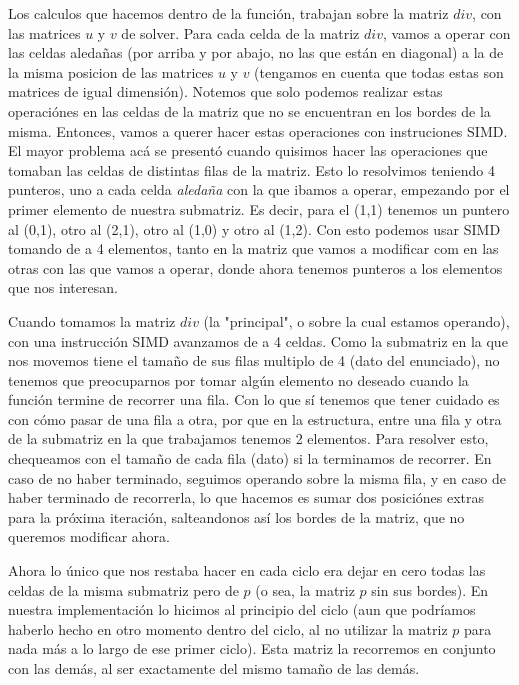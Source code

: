 \par Los calculos que hacemos dentro de la función, trabajan sobre la matriz $div$, con las matrices $u$ y $v$ de solver. Para cada celda de la matriz $div$, vamos a operar con las celdas aledañas (por arriba y por abajo, no las que están en diagonal) a la de la misma posicion de las matrices $u$ y $v$ (tengamos en cuenta que todas estas son matrices de igual dimensión). Notemos que solo podemos realizar estas operaciónes en las celdas de la matriz que no se encuentran en los bordes de la misma. Entonces, vamos a querer hacer estas operaciones con instruciones SIMD. El mayor problema acá se presentó cuando quisimos hacer las operaciones que tomaban las celdas de distintas filas de la matriz. Esto lo resolvimos teniendo 4 punteros, uno a cada celda \textit{aledaña} con la que ibamos a operar, empezando por el primer elemento de nuestra submatriz. Es decir, para el (1,1) tenemos un puntero al (0,1), otro al (2,1), otro al (1,0) y otro al (1,2). Con esto podemos usar SIMD tomando de a 4 elementos, tanto en la matriz que vamos a modificar com en las otras con las que vamos a operar, donde ahora tenemos punteros a los elementos que nos interesan.\newline

\par Cuando tomamos la matriz $div$ (la "principal", o sobre la cual estamos operando), con una instrucción SIMD avanzamos de a 4 celdas. Como la submatriz en la que nos movemos tiene el tamaño de sus filas multiplo de 4 (dato del enunciado), no tenemos que preocuparnos por tomar algún elemento no deseado cuando la función termine de recorrer una fila. Con lo que sí tenemos que tener cuidado es con cómo pasar de una fila a otra, por que en la estructura, entre una fila y otra de la submatriz en la que trabajamos tenemos 2 elementos. Para resolver esto, chequeamos con el tamaño de cada fila (dato) si la terminamos de recorrer. En caso de no haber terminado, seguimos operando sobre la misma fila, y en caso de haber terminado de recorrerla, lo que hacemos es sumar dos posiciónes extras para la próxima iteración, salteandonos así los bordes de la matriz, que no queremos modificar ahora.\newline

\par Ahora lo único que nos restaba hacer en cada ciclo era dejar en cero todas las celdas de la misma submatriz pero de $p$ (o sea, la matriz $p$ sin sus bordes). En nuestra implementación lo hicimos al principio del ciclo (aun que podríamos haberlo hecho en otro momento dentro del ciclo, al no  utilizar la matriz $p$ para nada más a lo largo de ese primer ciclo). Esta matriz la recorremos en conjunto con las demás, al ser exactamente del mismo tamaño de las demás.\newline


